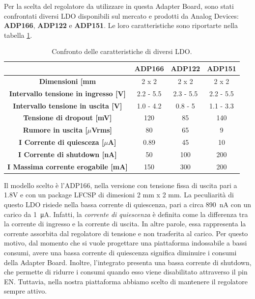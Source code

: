 Per la scelta del regolatore da utilizzare in questa Adapter Board, sono stati confrontati diversi LDO disponibili sul mercato e prodotti da Analog Devices: \textbf{ADP166}\cite{AnalogDevicesADP166}, \textbf{ADP122}\cite{AnalogDevicesADP122} e \textbf{ADP151}\cite{AnalogDevicesADP151}. Le loro caratteristiche sono riportarte nella tabella \ref{tab:ConfrontoLDO}.
\begin{table}[h]
	\renewcommand{\arraystretch}{1.5}
	\begin{tabular}{cccc}
		\hline
		& \textbf{ADP166} & \textbf{ADP122} & \textbf{ADP151} \\ \hline
		\textbf{Dimensioni {[}mm\ap{2}{]}}                   & 2 x 2           & 2 x 2           & 2 x 2           \\ \hline
		\textbf{Intervallo tensione in ingresso {[}V{]}}  & 2.2 - 5.5       & 2.3 - 5.5       & 2.2 - 5.5       \\ \hline
		\textbf{Intervallo tensione in uscita {[}V{]}}    & 1.0 - 4.2       & 0.8 - 5         & 1.1 - 3.3       \\ \hline
		\textbf{Tensione di dropout {[}mV{]}}            & 120             & 85              & 140             \\ \hline
		\textbf{Rumore in uscita {[}$\mu$Vrms{]}}         & 80              & 65              & 9               \\ \hline
		\textbf{I\ped{q} Corrente di quiesceza {[}$\mu$A{]}}    & 0.89            & 45              & 10              \\ \hline
		\textbf{I\ped{s} Corrente di shutdown {[}nA{]}}      & 50              & 100             & 200             \\ \hline
		\textbf{I\ped{MAX} Massima corrente erogabile {[}mA{]}} & 150             & 300             & 200             \\ \hline
	\end{tabular}
	\caption{Confronto delle caratteristiche di diversi LDO.}
	\label{tab:ConfrontoLDO}
\end{table}

\noindent Il modello scelto è l'ADP166, nella versione con tensione fissa di uscita pari a 1.8V e con un package LFCSP di dimesioni 2 mm x 2 mm. La peculiarità di questo LDO risiede nella bassa corrente di quiescenza, pari a circa \SI{890}{\nano\ampere} con un carico da \SI{1}{\micro\ampere}\cite{AnalogDevicesADP166}. Infatti, la \textit{corrente di quiescenza} è definita come la differenza tra la corrente di ingresso e la corrente di uscita\cite{Lee1999}. In altre parole, essa rappresenta la corrente assorbita dal regolatore di tensione e non trasferita al carico. Per questo motivo, dal momento che si vuole progettare una piattaforma indossabile a bassi consumi, avere una bassa corrente di quiescenza significa diminuire i consumi della Adapter Board. Inoltre, l'integrato presenta una bassa corrente di shutdown, che permette di ridurre i consumi quando esso viene disabilitato attraverso il pin EN. Tuttavia, nella nostra piattaforma abbiamo scelto di mantenere il regolatore sempre attivo.

